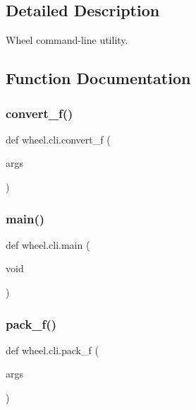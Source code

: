 \subsection{Detailed Description}
\begin{DoxyVerb}Wheel command-line utility.
\end{DoxyVerb}
 

\subsection{Function Documentation}
\mbox{\label{namespacewheel_1_1cli_a0433140019e2a2689c1a3526bb73e716}} 
\subsubsection{\texorpdfstring{convert\+\_\+f()}{convert\_f()}}
{\footnotesize\ttfamily def wheel.\+cli.\+convert\+\_\+f (\begin{DoxyParamCaption}\item[{}]{args }\end{DoxyParamCaption})}

\mbox{\label{namespacewheel_1_1cli_a920eff645c9f0a1cbe67a7733517f030}} 
\subsubsection{\texorpdfstring{main()}{main()}}
{\footnotesize\ttfamily def wheel.\+cli.\+main (\begin{DoxyParamCaption}\item[{void}]{ }\end{DoxyParamCaption})}

\mbox{\label{namespacewheel_1_1cli_aa647993da58a45ca360ff98d241cd8a8}} 
\subsubsection{\texorpdfstring{pack\+\_\+f()}{pack\_f()}}
{\footnotesize\ttfamily def wheel.\+cli.\+pack\+\_\+f (\begin{DoxyParamCaption}\item[{}]{args }\end{DoxyParamCaption})}

